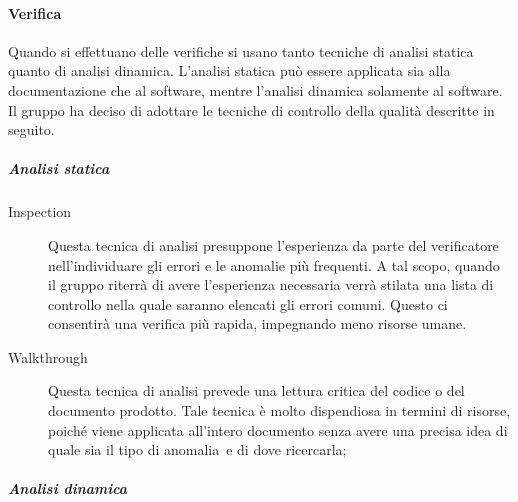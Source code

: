 \documentclass[../PianoDiQualifica.tex]{subfiles}
\begin{document}
				\paragraph{Verifica}
				 Quando si effettuano delle verifiche si usano tanto tecniche di analisi statica quanto di analisi dinamica. L'analisi statica può essere applicata sia alla documentazione che al software\g, mentre l'analisi dinamica solamente al software\g. Il gruppo ha deciso di adottare le tecniche di controllo della qualità descritte in seguito.
				 \subparagraph{Analisi statica}
					\begin{description}
						\item[Inspection] Questa tecnica di analisi presuppone l'esperienza da parte del verificatore nell'individuare gli errori e le anomalie più frequenti. A tal scopo, quando il gruppo riterrà di avere l'esperienza necessaria verrà stilata una lista di controllo nella quale saranno elencati gli errori comuni. Questo ci consentirà una verifica più rapida, impegnando meno risorse umane.
						\item[Walkthrough] Questa tecnica di analisi prevede una lettura critica del codice o del documento prodotto\g. Tale tecnica è molto dispendiosa in termini di risorse, poiché viene applicata all'intero documento senza avere una precisa idea di quale sia il tipo di anomalia\g\ e di dove ricercarla;
					\end{description}
					\subparagraph{Analisi dinamica}
\end{document}
